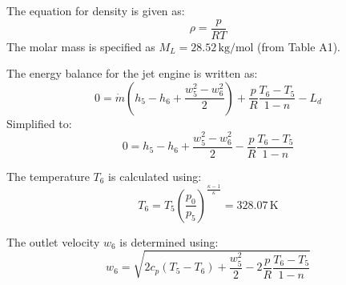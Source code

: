 The equation for density is given as:  
\[
\rho = \frac{p}{R T}
\]  
The molar mass is specified as \(M_L = 28.52 \, \text{kg/mol}\) (from Table A1).  

The energy balance for the jet engine is written as:  
\[
0 = \dot{m} \left( h_5 - h_6 + \frac{w_5^2 - w_6^2}{2} \right) + \frac{p}{R} \frac{T_6 - T_5}{1 - n} - L_{d}
\]  
Simplified to:  
\[
0 = h_5 - h_6 + \frac{w_5^2 - w_6^2}{2} - \frac{p}{R} \frac{T_6 - T_5}{1 - n}
\]  

The temperature \(T_6\) is calculated using:  
\[
T_6 = T_5 \left( \frac{p_0}{p_5} \right)^{\frac{\kappa - 1}{\kappa}} = 328.07 \, \text{K}
\]  

The outlet velocity \(w_6\) is determined using:  
\[
w_6 = \sqrt{2 c_p (T_5 - T_6) + \frac{w_5^2}{2} - 2 \frac{p}{R} \frac{T_6 - T_5}{1 - n}}
\]